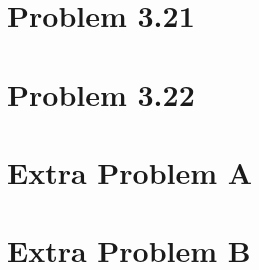 \documentclass[11pt,a4paper,oneside]{report}
\begin{document}
\section*{Problem 3.21}


\section*{Problem 3.22}


\section*{Extra Problem A}


\section*{Extra Problem B}
\end{document}
